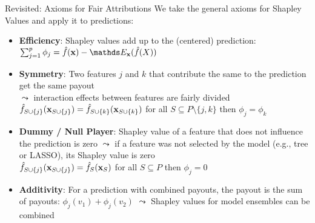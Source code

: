 \documentclass[11pt,compress,t,notes=noshow, aspectratio=169, xcolor=table]{beamer}
\begin{document}
\begin{frame}{Revisited: Axioms for Fair Attributions}
  We take the general axioms for Shapley Values and apply it to predictions:
  \vspace{0.25cm}
  \begin{itemize}[<+->]
  \itemsep1em
    \item \textbf{Efficiency}: Shapley values add up to the (centered) prediction: %
    $\sum\nolimits_{j=1}^p\phi_j=\fh(\xv)-\E_{\xv}(\fh(X))$
    \item \textbf{Symmetry}: Two features $j$ and $k$ that contribute the same to the prediction get the same payout\\
    $\leadsto$ interaction effects between features are fairly divided \\
      $\fh_{S\cup\{j\}}(\xv_{\Scupj}) = \fh_{\Scupk}(\xv_{\Scupk})$ for all $S \subseteq P\setminus\{j,k\}$ then $\phi_j=\phi_k$
    \item \textbf{Dummy / Null Player}: Shapley value of a feature that does not influence the prediction is zero $\leadsto$ if a feature was not selected by the model (e.g., tree or LASSO), its Shapley value is zero  \\
      $\fh_{\Scupj}(\xv_{\Scupj})=\fhS(\xv_S)$ for all $S \subseteq P$ then $\phi_j=0$
    \item \textbf{Additivity}:  For a prediction with combined payouts, the
      payout is the sum of payouts: $\phi_j(v_1) + \phi_j(v_2)$ $\leadsto$ Shapley values for model ensembles can be combined
  \end{itemize}
\end{frame}



\end{document}
